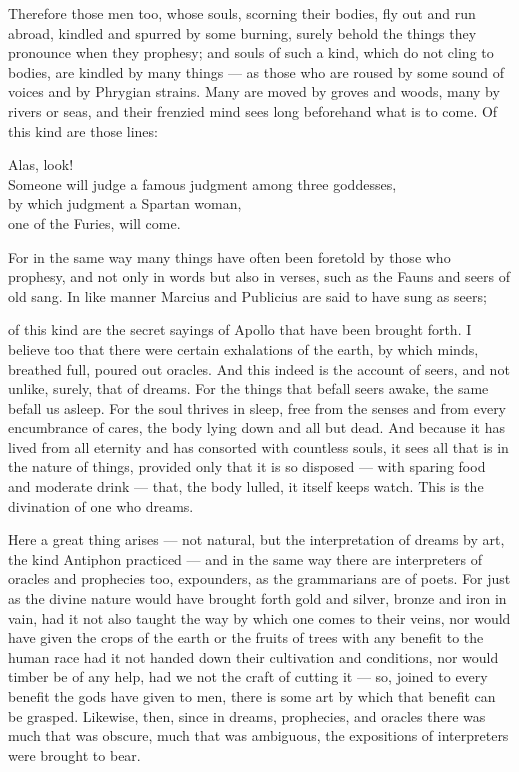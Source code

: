  Therefore those men too, whose souls, scorning their bodies, fly out and run abroad, kindled and spurred by some burning, surely behold the things they pronounce when they prophesy; and souls of such a kind, which do not cling to bodies, are kindled by many things — as those who are roused by some sound of voices and by Phrygian strains. Many are moved by groves and woods, many by rivers or seas, and their frenzied mind sees long beforehand what is to come. Of this kind are those lines:

Alas, look! \\
Someone will judge a famous judgment among three goddesses, \\
by which judgment a Spartan woman, \\
one of the Furies, will come.

For in the same way many things have often been foretold by those who prophesy, and not only in words but also in verses, such as the Fauns and seers of old sang. In like manner Marcius and Publicius are said to have sung as seers;

 of this kind are the secret sayings of Apollo that have been brought forth. I believe too that there were certain exhalations of the earth, by which minds, breathed full, poured out oracles. And this indeed is the account of seers, and not unlike, surely, that of dreams. For the things that befall seers awake, the same befall us asleep. For the soul thrives in sleep, free from the senses and from every encumbrance of cares, the body lying down and all but dead. And because it has lived from all eternity and has consorted with countless souls, it sees all that is in the nature of things, provided only that it is so disposed — with sparing food and moderate drink — that, the body lulled, it itself keeps watch. This is the divination of one who dreams.

 Here a great thing arises — not natural, but the interpretation of dreams by art, the kind Antiphon practiced — and in the same way there are interpreters of oracles and prophecies too, expounders, as the grammarians are of poets. For just as the divine nature would have brought forth gold and silver, bronze and iron in vain, had it not also taught the way by which one comes to their veins, nor would have given the crops of the earth or the fruits of trees with any benefit to the human race had it not handed down their cultivation and conditions, nor would timber be of any help, had we not the craft of cutting it — so, joined to every benefit the gods have given to men, there is some art by which that benefit can be grasped. Likewise, then, since in dreams, prophecies, and oracles there was much that was obscure, much that was ambiguous, the expositions of interpreters were brought to bear.

